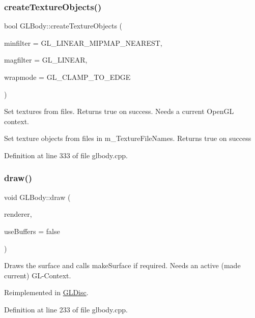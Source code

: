 \subsubsection{\texorpdfstring{createTextureObjects()}{createTextureObjects()}}
{\footnotesize\ttfamily bool G\+L\+Body\+::create\+Texture\+Objects (\begin{DoxyParamCaption}\item[{G\+Lenum}]{minfilter = {\ttfamily GL\+\_\+LINEAR\+\_\+MIPMAP\+\_\+NEAREST},  }\item[{G\+Lenum}]{magfilter = {\ttfamily GL\+\_\+LINEAR},  }\item[{G\+Lenum}]{wrapmode = {\ttfamily GL\+\_\+CLAMP\+\_\+TO\+\_\+EDGE} }\end{DoxyParamCaption})}

Set textures from files. Returns true on success. Needs a current Open\+GL context.

Set texture objects from files in m\+\_\+\+Texture\+File\+Names. Returns true on success 

Definition at line 333 of file glbody.\+cpp.

\mbox{\label{class_g_l_body_aaeb47c0a8cfc36caed81fc139c42ddfc}} 
\subsubsection{\texorpdfstring{draw()}{draw()}}
{\footnotesize\ttfamily void G\+L\+Body\+::draw (\begin{DoxyParamCaption}\item[{\mbox{\hyperlink{class_g_l_e_s_renderer}{G\+L\+E\+S\+Renderer}} $\ast$}]{renderer,  }\item[{bool}]{use\+Buffers = {\ttfamily false} }\end{DoxyParamCaption})\hspace{0.3cm}{\ttfamily [virtual]}}

Draws the surface and calls make\+Surface if required. Needs an active (made current) G\+L-\/\+Context. 

Reimplemented in \mbox{\hyperlink{class_g_l_disc_a7fca90525cba1fb6099d70730375cc6e}{G\+L\+Disc}}.



Definition at line 233 of file glbody.\+cpp.

\mbox{\label{class_g_l_body_a10511a36b5bc7012290252f84d40ac74}} 
